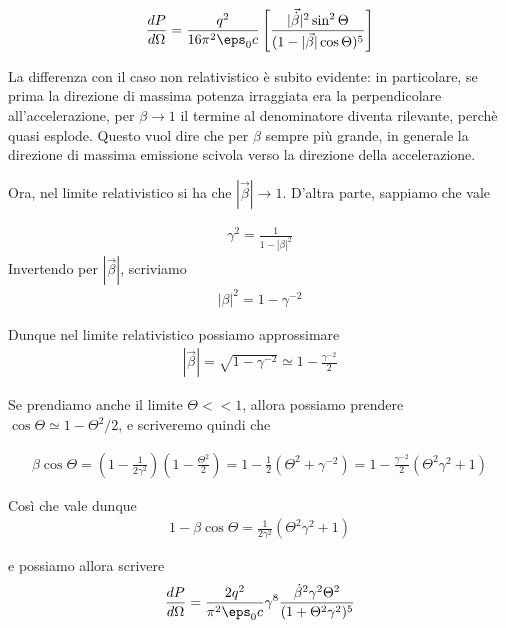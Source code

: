 \documentclass{report}
\begin{document}
\begin{enumerate}
\begin{enumerate}
        \begin{align}
            \frac{dP}{d\Omega} = \frac{q^2}{16\pi^2\eps_0 c} \left[\frac{|\vec{\dot{\beta}}|^2\sin^2\Theta}{(1-|\vec{\beta}|\cos\Theta)^5}\right]
        \end{align}
    

    La differenza con il caso non relativistico è subito evidente: in particolare, se prima la direzione di massima potenza irraggiata era la perpendicolare all'accelerazione, per \(\beta \rightarrow 1\) il termine al denominatore diventa rilevante, perchè quasi esplode. Questo vuol dire che per \(\beta\) sempre più grande, in generale la direzione di massima emissione scivola verso la direzione della accelerazione. 


    Ora, nel limite relativistico si ha che \(|\vec{\beta}|\rightarrow 1\). D'altra parte, sappiamo che vale

    \begin{align}
        \gamma^2 = \frac{1}{1-|\beta|^2 }
    \end{align}
    Invertendo per \(|\vec{\beta}|\), scriviamo 
    \begin{align}
        |\beta|^2 = 1 - \gamma^{-2}
    \end{align}

    Dunque nel limite relativistico possiamo approssimare 
    \begin{align}
        |\vec{\beta}| = \sqrt{1 - \gamma^{-2}} \simeq  1 - \frac{\gamma^{-2}}{2}
    \end{align}

    Se prendiamo anche il limite \(\Theta << 1\), allora possiamo prendere \(\cos\Theta \simeq 1 - \Theta^2/2\), e scriveremo quindi che 

    \begin{align}
        \beta\cos\Theta = \left(1- \frac{1}{2\gamma^2}\right)\left(1- \frac{\Theta^2}{2}\right) = 1 - \frac{1}{2}(\Theta^2 + \gamma^{-2}) = 1 - \frac{\gamma^{-2}}{2}(\Theta^2\gamma^{2} + 1) 
    \end{align}

    Così che vale dunque 
    \begin{align}
        1 - \beta\cos\Theta = \frac{1}{2\gamma^2}\left(\Theta^2\gamma^2 + 1\right)
    \end{align}

    e possiamo allora scrivere 
    \begin{align}
        \frac{dP}{d\Omega} = \frac{2q^2}{\pi^2\eps_0c}\gamma^8 \frac{\dot{\beta}^2 \gamma^2\Theta^2}{(1 + \Theta^2\gamma^2)^5}
    \end{align}


\end{enumerate}
\end{enumerate}
\end{document}

